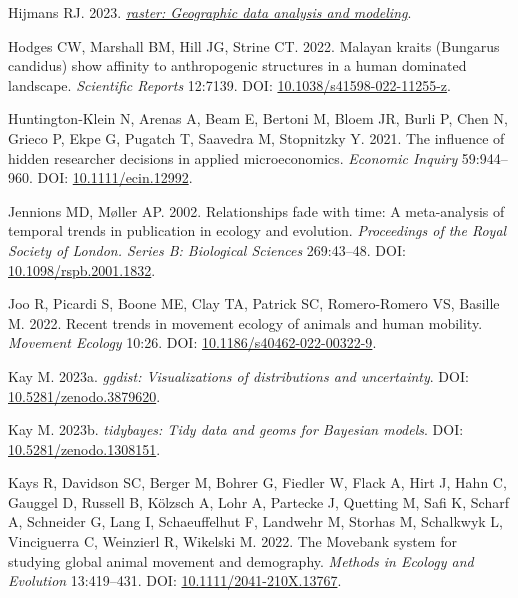 \documentclass[10pt,a4paper]{article}
\newlength{\cslhangindent}
\newlength{\cslentryspacingunit} %
\newenvironment{CSLReferences}[2] %
 {%
  \setlength{\parindent}{0pt}
  \ifodd #1
  \let\oldpar\par
  \def\par{\hangindent=\cslhangindent\oldpar}
  \fi
  \setlength{\parskip}{#2\cslentryspacingunit}
 }%
 {}
\begin{document}
\begin{CSLReferences}{1}{0}
\leavevmode{}%
Hijmans RJ. 2023. \emph{\href{https://CRAN.R-project.org/package=raster}{{raster}: Geographic data analysis and modeling}}.

\leavevmode{}%
Hodges CW, Marshall BM, Hill JG, Strine CT. 2022. Malayan kraits ({Bungarus} candidus) show affinity to anthropogenic structures in a human dominated landscape. \emph{Scientific Reports} 12:7139. DOI: \href{https://doi.org/10.1038/s41598-022-11255-z}{10.1038/s41598-022-11255-z}.

\leavevmode{}%
Huntington‐Klein N, Arenas A, Beam E, Bertoni M, Bloem JR, Burli P, Chen N, Grieco P, Ekpe G, Pugatch T, Saavedra M, Stopnitzky Y. 2021. The influence of hidden researcher decisions in applied microeconomics. \emph{Economic Inquiry} 59:944--960. DOI: \href{https://doi.org/10.1111/ecin.12992}{10.1111/ecin.12992}.

\leavevmode{}%
Jennions MD, Møller AP. 2002. Relationships fade with time: A meta-analysis of temporal trends in publication in ecology and evolution. \emph{Proceedings of the Royal Society of London. Series B: Biological Sciences} 269:43--48. DOI: \href{https://doi.org/10.1098/rspb.2001.1832}{10.1098/rspb.2001.1832}.

\leavevmode{}%
Joo R, Picardi S, Boone ME, Clay TA, Patrick SC, Romero-Romero VS, Basille M. 2022. Recent trends in movement ecology of animals and human mobility. \emph{Movement Ecology} 10:26. DOI: \href{https://doi.org/10.1186/s40462-022-00322-9}{10.1186/s40462-022-00322-9}.

\leavevmode{}%
Kay M. 2023a. \emph{{ggdist}: Visualizations of distributions and uncertainty}. DOI: \href{https://doi.org/10.5281/zenodo.3879620}{10.5281/zenodo.3879620}.

\leavevmode{}%
Kay M. 2023b. \emph{{tidybayes}: Tidy data and geoms for {Bayesian} models}. DOI: \href{https://doi.org/10.5281/zenodo.1308151}{10.5281/zenodo.1308151}.

\leavevmode{}%
Kays R, Davidson SC, Berger M, Bohrer G, Fiedler W, Flack A, Hirt J, Hahn C, Gauggel D, Russell B, Kölzsch A, Lohr A, Partecke J, Quetting M, Safi K, Scharf A, Schneider G, Lang I, Schaeuffelhut F, Landwehr M, Storhas M, Schalkwyk L, Vinciguerra C, Weinzierl R, Wikelski M. 2022. The {Movebank} system for studying global animal movement and demography. \emph{Methods in Ecology and Evolution} 13:419--431. DOI: \href{https://doi.org/10.1111/2041-210X.13767}{10.1111/2041-210X.13767}.


\end{CSLReferences}
\end{document}
